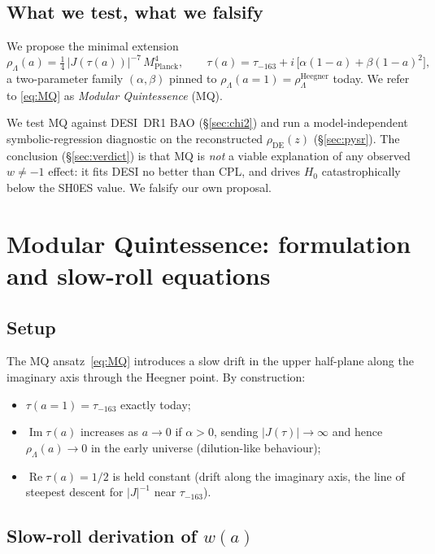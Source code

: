 \documentclass[11pt,letterpaper,twoside]{article}
\newcommand{\Mpl}{M_{\mathrm{Planck}}}
\newcommand{\rDE}{\rho_{\mathrm{DE}}}
\newcommand{\rL}{\rho_{\Lambda}}
\newcommand{\Heegner}{\tau_{-163}}
\begin{document}
\subsection{What we test, what we falsify}

We propose the minimal extension
\begin{equation}\label{eq:MQ}
  \rL(a)=\tfrac{1}{4}\,\bigl|J(\tau(a))\bigr|^{-7}\,\Mpl^{4},\qquad
  \tau(a)=\Heegner+i\,\bigl[\alpha(1-a)+\beta(1-a)^{2}\bigr],
\end{equation}
a two-parameter family $(\alpha,\beta)$ pinned to
$\rL(a=1)=\rL^{\mathrm{Heegner}}$ today.
We refer to \eqref{eq:MQ} as \emph{Modular Quintessence} (MQ).

We test MQ against DESI~DR1 BAO (\S\ref{sec:chi2}) and run a model-independent
symbolic-regression diagnostic on the reconstructed $\rDE(z)$
(\S\ref{sec:pysr}).
The conclusion (\S\ref{sec:verdict}) is that MQ is \emph{not} a viable explanation
of any observed $w\neq-1$ effect: it fits DESI no better than CPL, and drives
$H_{0}$ catastrophically below the SH0ES value.
We falsify our own proposal.

\section{Modular Quintessence: formulation and slow-roll equations}\label{sec:formulation}

\subsection{Setup}

The MQ ansatz~\eqref{eq:MQ} introduces a slow drift in the upper half-plane along
the imaginary axis through the Heegner point. By construction:
\begin{itemize}[leftmargin=*,topsep=0.1em,itemsep=0.1em]
\item $\tau(a=1)=\Heegner$ exactly today;
\item $\operatorname{Im}\tau(a)$ increases as $a\to 0$ if $\alpha>0$, sending
      $|J(\tau)|\to\infty$ and hence $\rL(a)\to 0$ in the early universe
      (dilution-like behaviour);
\item $\operatorname{Re}\tau(a)=1/2$ is held constant
      (drift along the imaginary axis, the line of steepest descent for
      $|J|^{-1}$ near $\Heegner$).
\end{itemize}

\subsection{Slow-roll derivation of $w(a)$}
\end{document}
